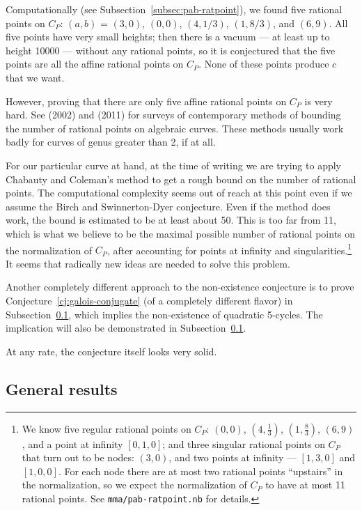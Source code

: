 Computationally (see Subsection~\ref{subsec:pab-ratpoint}), we found
five rational points on $C_P$: $(a, b)$ = $(3, 0)$, $(0, 0)$, $(4,
1/3)$, $(1, 8/3)$, and $(6, 9)$. All five points have very small
heights; then there is a vacuum --- at least up to height 10000 ---
without any rational points, so it is conjectured that the five points
are all the affine rational points on $C_P$. None of these points
produce $c$ that we want.

However, proving that there are only five affine rational points on
$C_P$ is very hard. See \cite{MR1956273} (2002) and \cite{MR2780629}
(2011) for surveys of contemporary methods of bounding the number of
rational points on algebraic curves. These methods usually work badly
for curves of genus greater than 2, if at all.

For our particular curve at hand, at the time of writing we are trying
to apply Chabauty and Coleman's method to get a rough bound on the
number of rational points. The computational complexity seems out of
reach at this point even if we assume the Birch and Swinnerton-Dyer
conjecture. Even if the method does work, the bound is estimated to be
at least about 50. This is too far from 11, which is what we believe
to be the maximal possible number of rational points on the
normalization of $C_P$, after accounting for points at infinity and
singularities.\footnote{%
  We know five regular rational points on $C_P$: $(0, 0)$, $(4,
  \frac{1}{3})$, $(1, \frac{8}{3})$, $(6, 9)$, and a point at infinity
  $[0, 1, 0]$; and three singular rational points on $C_P$ that turn
  out to be nodes: $(3, 0)$, and two points at infinity --- $[1, 3,
  0]$ and $[1, 0, 0]$. For each node there are at most two rational
  points ``upstairs'' in the normalization, so we expect the
  normalization of $C_P$ to have at most 11 rational points. See
  \texttt{mma/pab-ratpoint.nb} for details.}
It seems that radically new ideas are needed to solve this problem.

Another completely different approach to the non-existence conjecture
is to prove Conjecture~\ref{cj:galois-conjugate} (of a completely
different flavor) in Subsection~\ref{subsec:general}, which implies
the non-existence of quadratic 5-cycles. The implication will also be
demonstrated in Subsection~\ref{subsec:general}.

At any rate, the conjecture itself looks very solid.

\subsection{General results}
\label{subsec:general}

